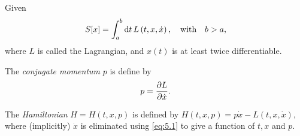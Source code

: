 \begin{question}
Given
\[
	S[x] = \int_{a}^{b}\mathrm{d} t\, L\left(t, x, \dot{x}\right),\quad\text{with}\quad b>a,
\]
where $L$ is called the Lagrangian, and $x(t)$ is at least twice differentiable.

The \textit{conjugate momentum} $p$ is define by
\begin{equation}
	\label{eq:5.1}
	p = \frac{\partial L}{\partial \dot{x}}.
\end{equation}
\qpart %

\qpart %

\qpart %
The \textit{Hamiltonian} $H=H(t,x,p)$ is defined by $H(t,x,p) = p\dot{x} - L(t,x,\dot{x})$, where (implicitly) $\dot{x}$ is eliminated using \eqref{eq:5.1} to give a function of $t,x$ and $p$.

\qpart %

\qpart %

\qpart

\end{question}
